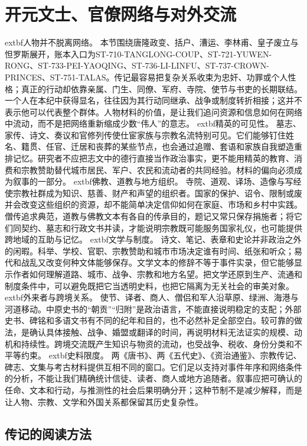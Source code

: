 \section{开元文士、官僚网络与对外交流} \label{sec:kaiyuan-literary-elites-exchange}  \noindent	extbf{人物并不脱离网络。} 本节围绕唐隆政变、括户、漕运、李林甫、皇子废立与怛罗斯展开，账本入口为ST-710-TANGLONG-COUP、ST-721-YUWEN-RONG、ST-733-PEI-YAOQING、ST-736-LI-LINFU、ST-737-CROWN-PRINCES、ST-751-TALAS。传记最容易把复杂关系收束为忠奸、功罪或个人性格；真正的行动却依靠亲属、门生、同僚、军府、寺院、使节与书吏的长期联结。一个人在本纪中获得显名，往往因为其行动同继承、战争或制度转折相接；这并不表示他可以代表整个群体。人物材料的价值，是让我们追问资源和信息如何在网络中流动，而不是把网络重新缩成少数“伟人”的意志。  \noindent	extbf{精英的可见性。} 墓志、家传、诗文、奏议和官修列传使仕宦家族与宗教名流特别可见。它们能够钉住姓名、籍贯、任官、迁居和丧葬的某些节点，也会通过追赠、套语和家族自我塑造重排记忆。研究者不应把志文中的德行直接当作政治事实，更不能用精英的教育、消费和宗教赞助替代城市居民、军户、农民和流动者的共同经验。材料的偏向必须成为叙事的一部分。  \noindent	extbf{佛教、道教与地方组织。} 寺院、道观、译场、造像与写经使宗教社群成为知识、慈善、财产和声望的组织者。国家的保护、诏令、限制或废并会改变这些组织的资源，却不能简单决定信仰如何在家庭、市场和乡村中实践。僧传追求典范，道教与佛教文本有各自的传承目的，题记又常只保存捐施者；将它们同契约、墓志和行政文书并读，才能说明宗教既可能服务国家礼仪，也可能提供跨地域的互助与记忆。  \noindent	extbf{文学与制度。} 诗文、笔记、表章和史论并非政治之外的闲暇。科举、学校、官职、宗教赞助和城市市场决定谁有时间、纸张和听众；易代和战乱又改变何种文体能够保存。文学文本的修辞不等于事件实录，但它能够显示作者如何理解道路、城市、战争、宗教和地方名望。把文学还原到生产、流通和制度条件中，可以避免既把它当透明史料，也把它隔离为无关社会的审美对象。  \noindent	extbf{外来者与跨境关系。} 使节、译者、商人、僧侣和军人沿草原、绿洲、海港与河道移动。中原史书的“朝贡”“归附”是政治语言，不能直接说明稳定的支配；外部史书、碑铭和多语文书有不同的纪年和目的，也不必然补足全部空白。较可靠的做法，是确认具体接触、战争、婚盟或翻译的时间，再说明材料无法证实的规模、动机和持续性。跨境交流既产生知识与物资的流动，也受战争、税收、身份分类和不平等约束。  \noindent	extbf{史料限度。} 两《唐书》、两《五代史》、《资治通鉴》、宗教传记、碑志、文集与考古材料提供互相不同的窗口。它们足以支持对事件年序和网络条件的分析，不能让我们精确统计信徒、读者、商人或地方追随者。叙事应把可确认的任命、文本和行动，与推测性的社会后果明确分开；这种节制不是减少解释，而是让人物、宗教、文学和外国关系都保留其历史复杂性。  \subsection{传记的阅读方法} 